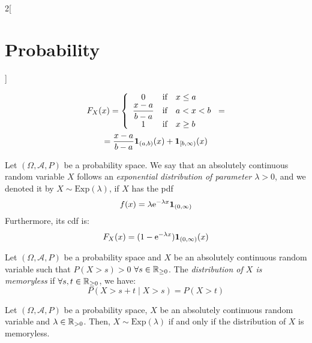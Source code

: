 \documentclass[../../../main.tex]{subfiles}
\begin{document}
\begin{multicols}{2}[\section{Probability}]
\begin{definition}
\begin{multline*}
      F_X(x)=\left\{
      \begin{array}{ccl}
        0                            & \text{if} & x\leq a \\
        \displaystyle\frac{x-a}{b-a} & \text{if} & a<x<b   \\
        1                            & \text{if} & x\geq b \\
      \end{array}
      \right.=\\=\frac{x-a}{b-a}\boldsymbol{\mathrm{1}}_{(a,b)}(x)+\boldsymbol{\mathrm{1}}_{[b,\infty)}(x)
    \end{multline*}
  \end{definition}
  \begin{definition}
    Let $(\Omega,\mathcal{A},P)$ be a probability space. We say that an absolutely continuous random variable $X$ follows an \textit{exponential distribution of parameter $\lambda>0$}, and we denoted it by $X\sim \text{Exp}(\lambda)$, if $X$ has the pdf $$f(x)=\lambda\mathrm{e}^{-\lambda x}\boldsymbol{\mathrm{1}}_{(0,\infty)}$$ Furthermore, its cdf is:
    $$F_X(x)=(1-\mathrm{e}^{-\lambda x})\boldsymbol{\mathrm{1}}_{(0,\infty)}(x)$$
  \end{definition}
  \begin{definition}
    Let $(\Omega,\mathcal{A},P)$ be a probability space and $X$ be an absolutely continuous random variable such that $P(X >s)>0$ $\forall s\in\mathbb{R}_{\geq 0}$. The \textit{distribution of $X$ is memoryless} if $\forall s,t\in\mathbb{R}_{\geq 0}$, we have: $$P(X>s+t\mid X >s)=P(X>t)$$
  \end{definition}
  \begin{prop}
    Let $(\Omega,\mathcal{A},P)$ be a probability space, $X$ be an absolutely continuous random variable and $\lambda\in\mathbb{R}_{>0}$. Then, $X\sim\text{Exp}(\lambda)$ if and only if the distribution of $X$ is memoryless.
  \end{prop}
\end{multicols}
\end{document}
